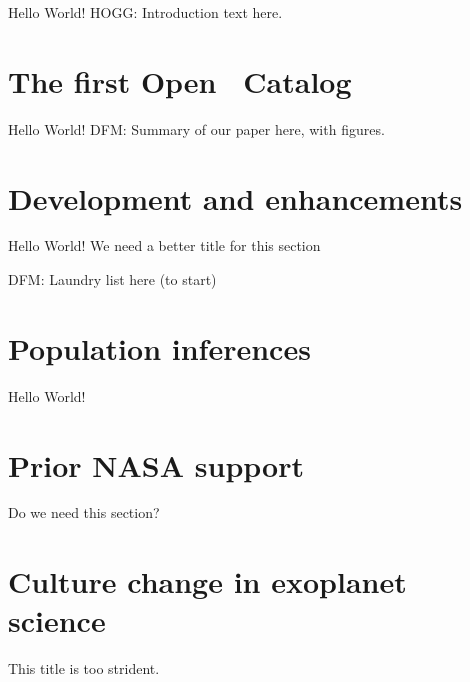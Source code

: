 \documentclass[12pt]{article}
\begin{document}
Hello World!  HOGG:  Introduction text here.

\section{The first Open \ketu\ Catalog}

Hello World!  DFM:  Summary of our paper here, with figures.

\section{Development and enhancements}

Hello World!  We need a better title for this section

DFM:  Laundry list here (to start)

\section{Population inferences}

Hello World!

\section{Prior NASA support}

Do we need this section?

\section{Culture change in exoplanet science}

This title is too strident.
\end{document}
